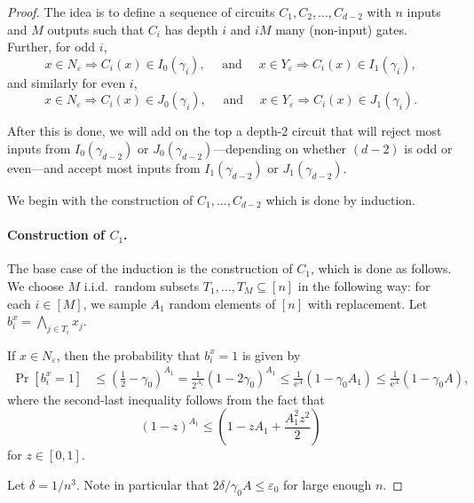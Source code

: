 \documentclass[11pt]{article}
\numberwithin{equation}{section}
\theoremstyle{definition}
\theoremstyle{plain}
\newcommand{\eee}{\mathrm e}
\newcommand{\prob}[2]{\mathop{\mathrm{Pr}}_{#1}[#2]}
\begin{document}
\begin{proof}
The idea is to define a sequence of circuits $C_1,C_2,\ldots,C_{d-2}$ with $n$ inputs and $M$ outputs such that $C_i$ has depth $i$ and $iM$ many (non-input) gates. Further, for odd $i$, 
\begin{equation}
x\in N_\varepsilon \Rightarrow C_i(x)\in I_0(\gamma_i),\quad\text{ and }\quad
x\in Y_\varepsilon \Rightarrow C_i(x)\in I_1(\gamma_i),\label{eq:oddi}
\end{equation}
and similarly for even $i$,
\begin{equation}
x\in N_\varepsilon \Rightarrow C_i(x)\in J_0(\gamma_i),\quad\text{ and }\quad
x\in Y_\varepsilon \Rightarrow C_i(x)\in J_1(\gamma_i).\label{eq:eveni}
\end{equation}

After this is done, we will add on
the %
top a depth-$2$ circuit that will reject most inputs from $I_0(\gamma_{d-2})$
or $J_0(\gamma_{d-2})$---depending on whether
%
%
%
$(d-2)$ is odd or even---and accept most inputs from $I_1(\gamma_{d-2})$ or $J_1(\gamma_{d-2})$. 

We begin with the construction of $C_1,\ldots,C_{d-2}$ which is done by induction. 

\paragraph{Construction of $C_1$.} The base case of the induction is the construction of $C_1$, which is done as follows. We choose $M$ i.i.d.\ random subsets $T_1,\ldots,T_M\subseteq [n]$ in the following way: for each $i\in [M]$, we sample $A_1$ random elements of $[n]$ with replacement. Let $b_i^x = \bigwedge_{j\in T_i}x_j$.

If $x\in N_\varepsilon$, then the probability that $b_i^x = 1$ is given by 
\begin{align*}
\prob{}{b_i^x = 1} &\le \left(\frac{1}{2}- \gamma_0\right)^{A_1}
= \frac{1}{2^{A_1}} \left(1-2\gamma_0\right)^{A_1} \leq \frac{1}{\eee^A}\left(1 -\gamma_0A_1 \right) \leq \frac{1}{\eee^A}\left(1 -\gamma_0A\right),
\end{align*}
where the second-last inequality follows from the fact that
\[
  (1-z)^{A_1} \leq \left(1-zA_1 + \frac{A_1^2z^2}{2}\right)
\]
for $z\in [0,1]$.

Let $\delta = 1/n^3$. Note in particular that $2\delta/\gamma_0A \leq \varepsilon_0$ for large enough $n$.


\end{proof}
\end{document}
